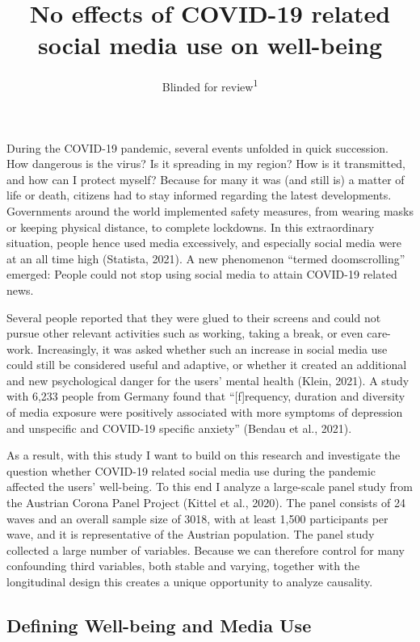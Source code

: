 \documentclass[
  english,
  man,mask,floatsintext]{apa6}
\title{No effects of COVID-19 related social media use on well-being}
\author{Blinded for review\textsuperscript{1}}
\date{}
\affiliation{\vspace{0.5cm}\textsuperscript{1} Blinded for review}
\begin{document}
\maketitle

During the COVID-19 pandemic,
several events unfolded in quick succession.
How dangerous is the virus? Is it spreading in my region? How is it transmitted, and how can I protect myself?
Because for many it was (and still is) a matter of life or death, citizens had to stay informed regarding the latest developments.
Governments around the world implemented safety measures, from wearing masks or keeping physical distance, to complete lockdowns.
In this extraordinary situation, people hence used media excessively, and especially social media were at an all time high (Statista, 2021).
A new phenomenon ``termed doomscrolling'' emerged:
People could not stop using social media to attain COVID-19 related news.

Several people reported that they were glued to their screens and could not pursue other relevant activities such as working, taking a break, or even care-work.
Increasingly, it was asked whether such an increase in social media use could still be considered useful and adaptive, or whether it created an additional and new psychological danger for the users' mental health (Klein, 2021).
A study with 6,233 people from Germany found that ``{[}f{]}requency, duration and diversity of media exposure were positively associated with more symptoms of depression and unspecific and COVID-19 specific anxiety'' (Bendau et al., 2021).

As a result, with this study I want to build on this research and investigate the question whether COVID-19 related social media use during the pandemic affected the users' well-being.
To this end I analyze a large-scale panel study from the Austrian Corona Panel Project (Kittel et al., 2020).
The panel consists of 24 waves and an overall sample size of 3018, with at least 1,500 participants per wave, and it is representative of the Austrian population.
The panel study collected a large number of variables.
Because we can therefore control for many confounding third variables, both stable and varying, together with the longitudinal design this creates a unique opportunity to analyze causality.

\hypertarget{defining-well-being-and-media-use}{%
\subsection{Defining Well-being and Media Use}\label{defining-well-being-and-media-use}}
\end{document}
